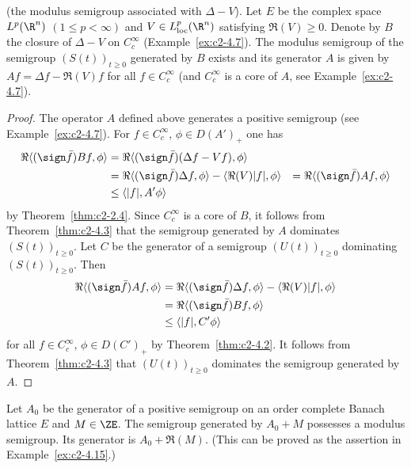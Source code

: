 \begin{example}\label{ex:c2-4.15}
(the modulus semigroup associated with $\Delta - V$).
Let $E$ be the complex space $L^{p}(\R^{n})$ $(1 \leq p < \infty)$ and $V \in L^{p}_{\text{loc}}(\R^{n})$ satisfying $\Re(V) \geq 0$.
Denote by $B$ the closure of\/ $\Delta - V$ on $C^{\infty}_{c}$
(\cf Example~\ref{ex:c2-4.7}).
The modulus semigroup of the semigroup $(S(t))_{t \geq 0}$ generated by $B$ exists and its generator $A$ is given by $Af = \Delta f - \Re(V)f$ for all $f \in C^{\infty}_{c}$ (and $C^{\infty}_{c}$ is a core of\/ $A$, see Example~\ref{ex:c2-4.7}).
\end{example}

\begin{proof}
The operator $A$ defined above generates a positive semigroup (see Example~\ref{ex:c2-4.7}).
For $f \in C^{\infty}_{c}$, $\phi \in D(A')_{+}$ one has
\begin{align*}
\Re\langle(\sign  \bar{f})Bf,\phi\rangle &= \Re\langle(\sign  \bar{f})(\Delta f - Vf),\phi\rangle \\
&=\Re\langle(\sign  \bar{f})\Delta f,\phi\rangle - \langle\Re(V)|f|,\phi\rangle &= \Re\langle(\sign  \bar{f})Af,\phi\rangle \\
&\leq \langle|f|,A'\phi\rangle 
\end{align*}
by Theorem~\ref{thm:c2-2.4}.
Since $C^{\infty}_{c}$ is a core of\/ $B$, it follows from Theorem~\ref{thm:c2-4.3}   that the semigroup generated by $A$ dominates $(S(t))_{t \geq 0}$.
Let $C$ be the generator of a semigroup $(U(t))_{t \geq 0}$ dominating $(S(t))_{t \geq 0}$.
Then
\begin{align*}
\Re\langle(\sign  \bar{f})Af,\phi\rangle &= \Re\langle(\sign  \bar{f})\Delta f,\phi\rangle - \langle\Re(V)|f|,\phi\rangle \\
&= \Re\langle(\sign  \bar{f})Bf,\phi\rangle\\
&\leq \langle|f|,C'\phi\rangle 
\end{align*}
for all  $f \in C^{\infty}_{c}$, $\phi \in D(C')_{+}$  by Theorem~\ref{thm:c2-4.2}. 
It follows from Theorem~\ref{thm:c2-4.3}   that $(U(t))_{t \geq 0}$ dominates the semigroup generated by $A$.
\end{proof}
\begin{example}\label{ex:c2-4.16}
Let $A_{0}$ be the generator of a positive semigroup on an order complete Banach lattice $E$ and $M \in \ZE$.
The semigroup generated by $A_{0} + M$ possesses a modulus semigroup. Its generator is $A_{0} + \Re(M)$. (This can be proved as the assertion in Example~\ref{ex:c2-4.15}.)
\end{example}

